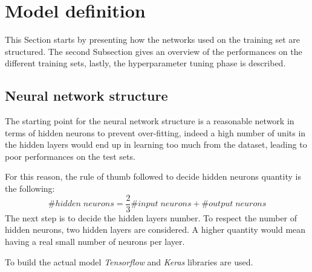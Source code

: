 \section{Model definition}
\label{model-definition}
This Section starts by presenting how the networks used on the training set are 
structured. The second Subsection gives an overview of the performances 
on the different training sets, lastly, the hyperparameter tuning phase
is described.

\subsection{Neural network structure}
The starting point for the neural network structure is a 
reasonable network in terms of hidden neurons to prevent over-fitting, 
indeed a high number of units in the hidden layers would end up in learning 
too much from the dataset, leading to poor performances on the test sets.

For this reason, the rule of thumb followed to decide hidden neurons quantity is the 
following: 
$$\#\mathit{hidden\; neurons} = \frac{2}{3}\#\mathit{input\;neurons}
+ \#\mathit{output\;neurons}$$
The next step is to decide the hidden layers number. To respect the 
number of hidden neurons, two hidden layers are considered. 
A higher quantity would mean having a real small number of neurons per layer.

To build the actual model \emph{Tensorflow} and \emph{Keras} libraries 
are used.~\cite{tensorflow}~\cite{keras}

